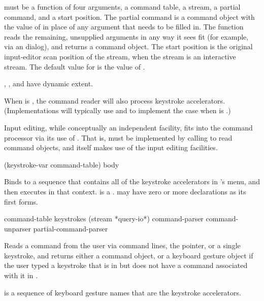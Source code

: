  must be a function of four arguments, a command
table, a stream, a partial command, and a start position.  The partial command
is a command object with the value of  in place
of any argument that needs to be filled in.  The function reads the remaining,
unsupplied arguments in any way it sees fit (for example, via an
 dialog), and returns a command object.  The start position
is the original input-editor scan position of the stream, when the stream is an
interactive stream.  The default value for  is the
value of .

, , and 
have dynamic extent.

When  is , the command reader will also process
keystroke accelerators.  (Implementations will typically use
 and  to
implement the case when  is .)

Input editing, while conceptually an independent facility, fits into the command
processor via its use of .  That is,  must be
implemented by calling  to read command objects, and 
itself makes use of the input editing facilities.


 {(keystroke-var command-table) \body body}

Binds  to a sequence that contains all of the keystroke
accelerators in 's menu, and then executes  in that
context.   is a .  
may have zero or more declarations as its first forms.

 {command-table keystrokes
                                        \key (stream *query-io*)
                                             command-parser command-unparser
                                             partial-command-parser}

Reads a command from the user via command lines, the pointer, or a single
keystroke, and returns either a command object, or a keyboard gesture object if
the user typed a keystroke that is in  but does not have a
command associated with it in .

 is a sequence of keyboard gesture names that are the keystroke
accelerators.

